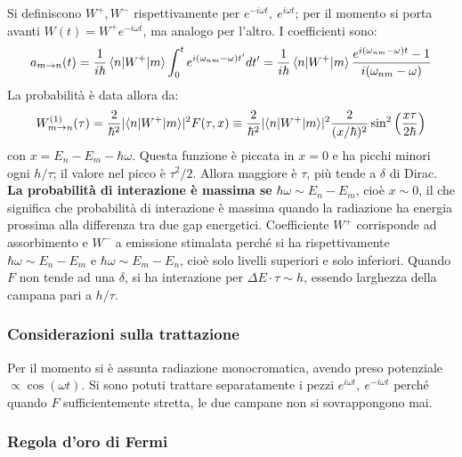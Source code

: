 \documentclass[10pt, a4paper]{scrartcl}
\numberwithin{equation}{subsection}
\theoremstyle{style1}
\theoremstyle{style2}
\begin{document}
Si definiscono $W^+,W^-$ rispettivamente per $e^{-i\omega t} , \ e^{i\omega t}  $; per il momento si porta avanti $W(t) = W^+ e^{-i\omega t} $, ma analogo per l'altro. I coefficienti sono:
\begin{equation}
	a_{m\to n } (t) = \frac{1}{i\hbar } \braket{n|W^+|m} \int_{0} ^t e^{i (\omega_{nm} -\omega)t '} dt' = \frac{1}{i\hbar }\braket{n|W^+|m} \frac{e^{i(\omega_{nm} -\omega)t} -1 }{i(\omega_{nm} -\omega)}
\end{equation}
La probabilit\`a \`e data allora da:
\begin{equation}
	W^{(1)}_{m\to n}  (\tau ) = \frac{2}{\hbar ^2}\lvert \braket{n|W^+|m}  \rvert ^2 F(\tau , x) \equiv \frac{2}{\hbar ^2}\lvert \braket{n|W^+|m}  \rvert ^2 \frac{2}{(x / \hbar )^2}\sin^2\left(\frac{x \tau }{2 \hbar }\right) 
\end{equation}
con $x = E_n-E_m-\hbar \omega$. Questa funzione \`e piccata in $x=0$ e ha picchi minori ogni $h / \tau $; il valore nel picco \`e $\tau ^2 / 2$. Allora maggiore \`e $\tau $, pi\`u tende a $\delta $ di Dirac. 
\textbf{La probabilit\`a di interazione \`e massima se} $\hbar \omega \sim E_n - E_m$, cio\`e $x \sim 0$, il che significa che probabilit\`a di interazione \`e massima quando la radiazione ha energia prossima alla differenza tra due gap energetici.
Coefficiente $W^+$ corrisponde ad assorbimento e $W^-$ a emissione stimalata perch\'e si ha rispettivamente $\hbar \omega\sim E_n - E_m$ e $\hbar \omega \sim E_m - E_n$, cio\`e solo livelli superiori e solo inferiori. 
Quando $F$ non tende ad una $\delta $, si ha interazione per $\Delta E \cdot \tau \sim h$, essendo larghezza della campana pari a $h / \tau $.

\subsubsection{Considerazioni sulla trattazione}
Per il momento si \`e assunta radiazione monocromatica, avendo preso potenziale $\propto \cos(\omega t)$.
Si sono potuti trattare separatamente i pezzi $e^{i\omega t} , \ e^{-i\omega t} $ perch\'e quando $F$ sufficientemente stretta, le due campane non si sovrappongono mai. 
\subsubsection{Regola d'oro di Fermi}
\end{document}
